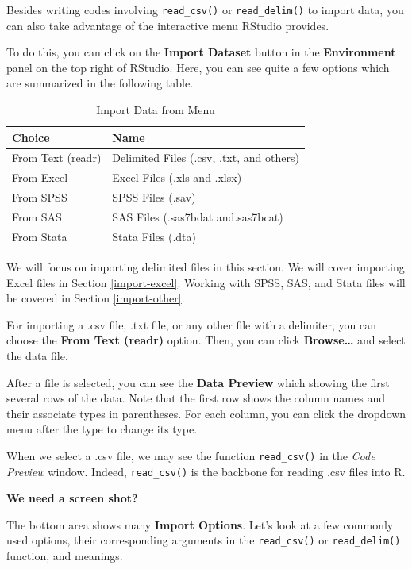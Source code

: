 \documentclass[
]{book}
\begin{document}
Besides writing codes involving \texttt{read\_csv()} or \texttt{read\_delim()} to import data, you can also take advantage of the interactive menu RStudio provides.

To do this, you can click on the \textbf{Import Dataset} button in the \textbf{Environment} panel on the top right of RStudio. Here, you can see quite a few options which are summarized in the following table.

\begin{table}

\caption{\label{tab:importMenu}Import Data from Menu}
\centering
\begin{tabular}[t]{l|l}
\hline
Choice & Name\\
\hline
From Text (readr) & Delimited Files (.csv, .txt, and others)\\
\hline
From Excel & Excel Files (.xls and .xlsx)\\
\hline
From SPSS & SPSS Files (.sav)\\
\hline
From SAS & SAS Files (.sas7bdat and.sas7bcat)\\
\hline
From Stata & Stata Files (.dta)\\
\hline
\end{tabular}
\end{table}

We will focus on importing delimited files in this section. We will cover importing Excel files in Section \ref{import-excel}. Working with SPSS, SAS, and Stata files will be covered in Section \ref{import-other}.

For importing a .csv file, .txt file, or any other file with a delimiter, you can choose the \textbf{From Text (readr)} option. Then, you can click \textbf{Browse\ldots{}} and select the data file.

After a file is selected, you can see the \textbf{Data Preview} which showing the first several rows of the data. Note that the first row shows the column names and their associate types in parentheses. For each column, you can click the dropdown menu after the type to change its type.

When we select a .csv file, we may see the function \texttt{read\_csv()} in the \emph{Code Preview} window. Indeed, \texttt{read\_csv()} is the backbone for reading .csv files into R.

\textbf{We need a screen shot?}

The bottom area shows many \textbf{Import Options}. Let's look at a few commonly used options, their corresponding arguments in the \texttt{read\_csv()} or \texttt{read\_delim()} function, and meanings.
\end{document}
